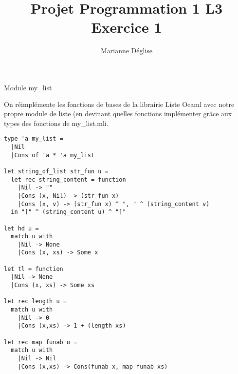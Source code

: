 \documentclass{article}
\author{Marianne Déglise}
\title{Projet Programmation 1 L3\\
Exercice 1}
\date{}
\theoremstyle{definition}
\begin{document}
\maketitle

\begin{section}{Module my\_list}

On réimplémente les fonctions de bases de la librairie Liste Ocaml avec notre propre module de liste (en devinant quelles fonctions implémenter grâce aux types des fonctions de my\_list.mli.


\begin{lstlisting}[language=caml]
type 'a my_list =
  |Nil
  |Cons of 'a * 'a my_list

let string_of_list str_fun u =
  let rec string_content = function
    |Nil -> ""
    |Cons (x, Nil) -> (str_fun x)
    |Cons (x, v) -> (str_fun x) ^ ", " ^ (string_content v)
  in "[" ^ (string_content u) ^ "]" 

let hd u =
  match u with
    |Nil -> None
    |Cons (x, xs) -> Some x

let tl = function
  |Nil -> None
  |Cons (x, xs) -> Some xs

let rec length u =
  match u with
    |Nil -> 0
    |Cons (x,xs) -> 1 + (length xs)

let rec map funab u =
  match u with
    |Nil -> Nil
    |Cons (x,xs) -> Cons(funab x, map funab xs)
\end{lstlisting}

\end{section}

\newpage
\end{document}
